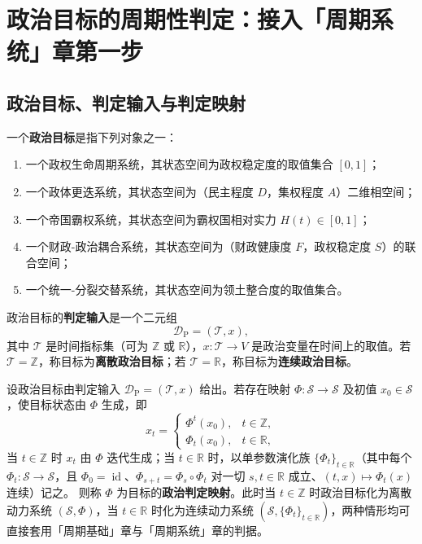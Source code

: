 \section{政治目标的周期性判定：接入「周期系统」章第一步}
\label{sec:politics_periodicity_decision}

\subsection{政治目标、判定输入与判定映射}

\begin{definition}[政治目标与判定输入]\label{def:politics_target}
一个\textbf{政治目标}是指下列对象之一：
\begin{enumerate}[label=(\roman*)]
    \item 一个政权生命周期系统，其状态空间为政权稳定度的取值集合 $[0,1]$；
    \item 一个政体更迭系统，其状态空间为（民主程度 $D$，集权程度 $A$）二维相空间；
    \item 一个帝国霸权系统，其状态空间为霸权国相对实力 $H(t)\in[0,1]$；
    \item 一个财政-政治耦合系统，其状态空间为（财政健康度 $F$，政权稳定度 $S$）的联合空间；
    \item 一个统一-分裂交替系统，其状态空间为领土整合度的取值集合。
\end{enumerate}
政治目标的\textbf{判定输入}是一个二元组
\[
\mathcal D_{\mathrm{P}}=(\mathcal T,x),
\]
其中 $\mathcal T$ 是时间指标集（可为 $\mathbb Z$ 或 $\mathbb R$），$x:\mathcal T\to V$ 是政治变量在时间上的取值。若 $\mathcal T=\mathbb Z$，称目标为\textbf{离散政治目标}；若 $\mathcal T=\mathbb R$，称目标为\textbf{连续政治目标}。
\end{definition}

\begin{definition}[政治判定映射]\label{def:politics_periodization}
设政治目标由判定输入 $\mathcal D_{\mathrm{P}}=(\mathcal T,x)$ 给出。若存在映射 $\Phi:\mathcal S\to\mathcal S$ 及初值 $x_0\in\mathcal S$，使目标状态由 $\Phi$ 生成，即
\[
x_t=\begin{cases}\Phi^t(x_0), & t\in\mathbb Z,\\ \Phi_t(x_0), & t\in\mathbb R,\end{cases}
\]
当 $t\in\mathbb Z$ 时 $x_t$ 由 $\Phi$ 迭代生成；当 $t\in\mathbb R$ 时，以单参数演化族 $\{\Phi_t\}_{t\in\mathbb R}$（其中每个 $\Phi_t:\mathcal S\to\mathcal S$，且 $\Phi_0=\operatorname{id}$、$\Phi_{s+t}=\Phi_s\circ\Phi_t$ 对一切 $s,t\in\mathbb R$ 成立、$(t,x)\mapsto\Phi_t(x)$ 连续）记之。
则称 $\Phi$ 为目标的\textbf{政治判定映射}。此时当 $t\in\mathbb Z$ 时政治目标化为离散动力系统 $(\mathcal S,\Phi)$，当 $t\in\mathbb R$ 时化为连续动力系统 $(\mathcal S,\{\Phi_t\}_{t\in\mathbb R})$，两种情形均可直接套用「周期基础」章与「周期系统」章的判据。
\end{definition}

